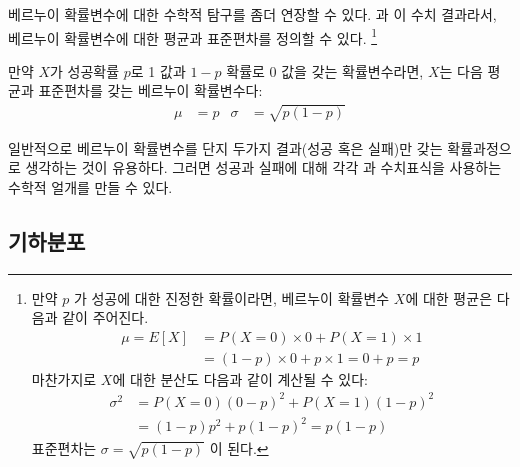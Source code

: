 베르누이 확률변수에 대한 수학적 탐구를 좀더 연장할 수 있다.  과  이 수치 결과라서, 베르누이 확률변수에 대한 평균과 표준편차를 정의할 수 있다.
\footnote{만약 ${p}$ 가 성공에 대한 진정한 확률이라면, 베르누이 확률변수 $X$에 대한 평균은 다음과 같이 주어진다.
\begin{align*}
\mu = E[X] &= P(X=0)\times0 + P(X=1)\times1 \\
	&= (1-p)\times0 + p\times 1 = 0+p = p
\end{align*}
마찬가지로 $X$에 대한 분산도 다음과 같이 계산될 수 있다:
\begin{align*}
\sigma^2 &= {P(X=0)(0-p)^2 + P(X=1)(1-p)^2} \\
	&= {(1-p)p^2 + p(1-p)^2} = {p(1-p)}
\end{align*}
표준편차는 $\sigma=\sqrt{p(1-p)}$ 이 된다.}

\begin{termBox}{
만약 $X$가 성공확률 $p$로 1 값과 $1-p$ 확률로 0 값을 갖는 확률변수라면, $X$는 다음 평균과 표준편차를 갖는 베르누이 확률변수다:
\begin{align*}
\mu &= p
	&\sigma&= \sqrt{p(1-p)}
\end{align*}}
\end{termBox}

일반적으로 베르누이 확률변수를 단지 두가지 결과(성공 혹은 실패)만 갖는 확률과정으로 생각하는 것이 유용하다. 그러면 성공과 실패에 대해 각각  과  수치표식을 사용하는 수학적 얼개를 만들 수 있다.


\subsection{기하분포}


